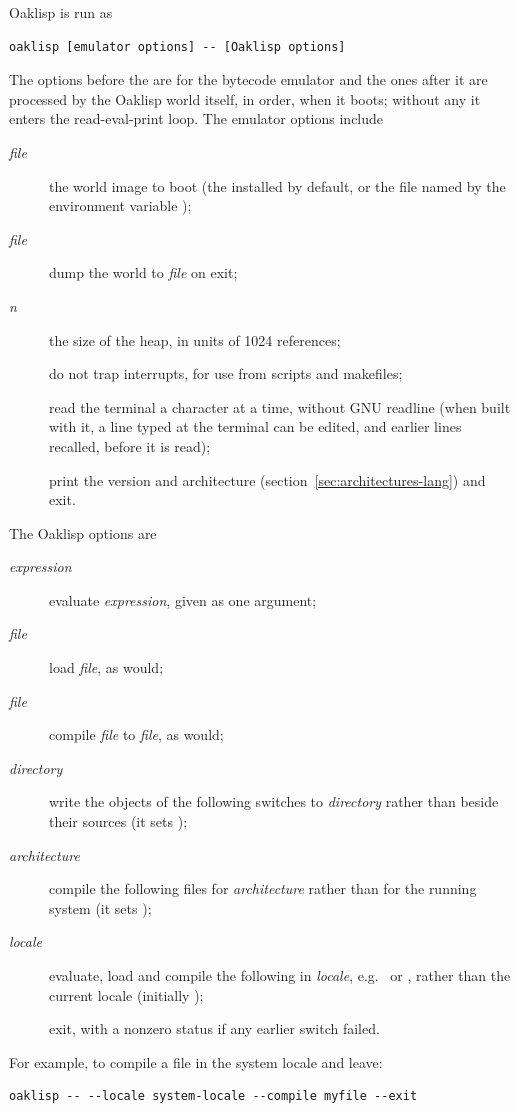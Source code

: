 Oaklisp is run as
\begin{verbatim}
oaklisp [emulator options] -- [Oaklisp options]
\end{verbatim}
The options before the \dfsw{{-}{-}} are for the bytecode emulator and
the ones after it are processed by the Oaklisp world itself, in
order, when it boots; without any it enters the read-eval-print loop.
The emulator options include
\begin{description}
\item[ \emph{file}] the world image to boot (the
  installed  by default, or the file named by the
  environment variable );
\item[ \emph{file}] dump the world to \emph{file} on exit;
\item[ \emph{n}] the size of the heap, in units of
  1024 references;
\item[] do not trap interrupts, for use from scripts
  and makefiles;
\item[] read the terminal a character at a
  time, without GNU readline (when built with it, a line typed at
  the terminal can be edited, and earlier lines recalled, before it is
  read);
\item[] print the version and architecture
  (section~\ref{sec:architectures-lang}) and exit.
\end{description}
The Oaklisp options are
\begin{description}
\item[ \emph{expression}] evaluate \emph{expression},
  given as one argument;
\item[ \emph{file}] load \emph{file}, as  would;
\item[ \emph{file}] compile \emph{file} to
  \emph{file}, as  would;
\item[ \emph{directory}] write the objects of the
  following  switches to \emph{directory} rather than
  beside their sources (it sets );
\item[ \emph{architecture}] compile the following files
  for \emph{architecture} rather than for the running system (it sets
  );
\item[ \emph{locale}] evaluate, load and compile the
  following in \emph{locale}, e.g.\  or
  , rather than the current locale (initially
  );
\item[] exit, with a nonzero status if any earlier switch
  failed.
\end{description}
For example, to compile a file in the system locale and leave:
\begin{verbatim}
oaklisp -- --locale system-locale --compile myfile --exit
\end{verbatim}

